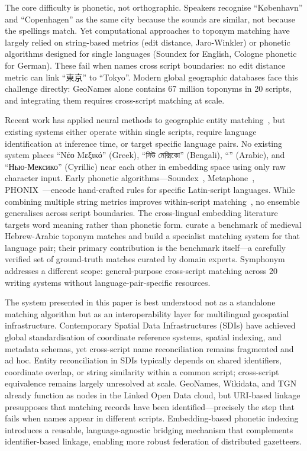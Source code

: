 \documentclass[11pt,a4paper]{article}
\newcommand{\textar}[1]{{\arabicfont\RL{#1}}}
\newcommand{\textbn}[1]{{\bengalifont #1}}
\newcommand{\textcn}[1]{{\chinesefont #1}}
\begin{document}
The core difficulty is phonetic, not orthographic. Speakers recognise ``København'' and ``Copenhagen'' as the same city because the sounds are similar, not because the spellings match. Yet computational approaches to toponym matching have largely relied on string-based metrics (edit distance, Jaro-Winkler) or phonetic algorithms designed for single languages (Soundex for English, Cologne phonetic for German). These fail when names cross script boundaries: no edit distance metric can link ``\textcn{東京}'' to ``Tokyo''. Modern global geographic databases face this challenge directly: GeoNames alone contains 67 million toponyms in 20 scripts, and integrating them requires cross-script matching at scale.

Recent work has applied neural methods to geographic entity matching~\citep{qiu2024geobert,rama2016,mehdie2025}, but existing systems either operate within single scripts, require language identification at inference time, or target specific language pairs. No existing system places ``Νέο Μεξικό'' (Greek), ``\textbn{নিউ মেক্সিকো}'' (Bengali), ``\textar{نيومكسيكو}'' (Arabic), and ``Нью-Мексико'' (Cyrillic) near each other in embedding space using only raw character input. Early phonetic algorithms---Soundex~\citep{odell1918}, Metaphone~\citep{philips1990}, PHONIX~\citep{gadd1990phonix}---encode hand-crafted rules for specific Latin-script languages. While combining multiple string metrics improves within-script matching~\citep{recchia2013,santos2018}, no ensemble generalises across script boundaries. The cross-lingual embedding literature~\citep{conneau2018,artetxe2018} targets word meaning rather than phonetic form. \citet{mehdie2025} curate a benchmark of medieval Hebrew-Arabic toponym matches and build a specialist matching system for that language pair; their primary contribution is the benchmark itself---a carefully verified set of ground-truth matches curated by domain experts. Symphonym addresses a different scope: general-purpose cross-script matching across 20 writing systems without language-pair-specific resources.

The system presented in this paper is best understood not as a standalone matching algorithm but as an interoperability layer for multilingual geospatial infrastructure. Contemporary Spatial Data Infrastructures (SDIs) have achieved global standardisation of coordinate reference systems, spatial indexing, and metadata schemas, yet cross-script name reconciliation remains fragmented and ad hoc. Entity reconciliation in SDIs typically depends on shared identifiers, coordinate overlap, or string similarity within a common script; cross-script equivalence remains largely unresolved at scale. GeoNames, Wikidata, and TGN already function as nodes in the Linked Open Data cloud, but URI-based linkage presupposes that matching records have been identified---precisely the step that fails when names appear in different scripts. Embedding-based phonetic indexing introduces a reusable, language-agnostic bridging mechanism that complements identifier-based linkage, enabling more robust federation of distributed gazetteers.
\end{document}
